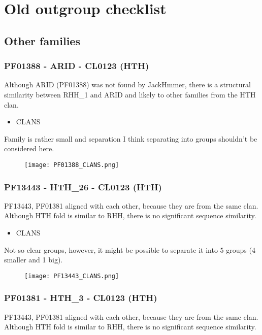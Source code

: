         \section{Old outgroup checklist}

        
        \subsection{Other families}
        
    \subsubsection{PF01388 - ARID - CL0123 (HTH)}
Although ARID (PF01388) was not found by JackHmmer, there is a structural similarity between RHH\_1 and ARID and likely to other families from the HTH clan.

\begin{itemize}
    \item CLANS
\end{itemize}
Family is rather small and separation I think separating into groups shouldn't be considered here.
\begin{figure}[H]
\begin{center}
\texttt{[image: PF01388\_CLANS.png]}
\end{center}
\end{figure}

    \subsubsection{PF13443 - HTH\_26 - CL0123 (HTH)}
PF13443, PF01381 aligned with each other, because they are from the same clan.
Although HTH fold is similar to RHH, there is no significant sequence similarity.

\begin{itemize}
    \item CLANS
\end{itemize}
Not so clear groups, however, it might be possible to separate it into 5 groups (4 smaller and 1 big).
\begin{figure}[H]
\begin{center}
\texttt{[image: PF13443\_CLANS.png]}
\end{center}
\end{figure}

    \subsubsection{PF01381 - HTH\_3 - CL0123 (HTH)}
PF13443, PF01381 aligned with each other, because they are from the same clan.
Although HTH fold is similar to RHH, there is no significant sequence similarity.

